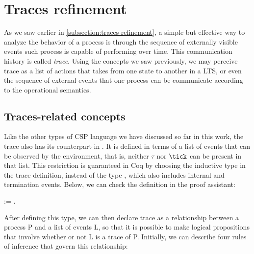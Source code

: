 \section{Traces refinement}
\label{section:traces}

As we saw earlier in \autoref{subsection:traces-refinement}, a simple but effective way to analyze the behavior of a process is through the sequence of externally visible events such process is capable of performing over time. This communication history is called \emph{trace}. Using the concepts we saw previously, we may perceive trace as a list of actions that takes from one state to another in a LTS, or even the sequence of external events that one process can be communicate according to the operational semantics.

\subsection{Traces-related concepts}

Like the other types of CSP language we have discussed so far in this work, the trace also has its counterpart in \CSPcoq{}. It is defined in terms of a list of events that can be observed by the environment, that is, neither $ \tau $ nor $ \tick $ can be present in that list. This restriction is guaranteed in Coq by choosing the inductive type  in the trace definition, instead of the type , which also includes internal and termination events. Below, we can check the definition in the proof assistant:

\begin{coqdoccode}
	\coqdocnoindent
	  :=  .\coqdoceol
\end{coqdoccode}

After defining this type, we can then declare trace as a relationship between a process P and a list of events L, so that it is possible to make logical propositions that involve whether or not L is a trace of P. Initially, we can describe four rules of inference that govern this relationship:

